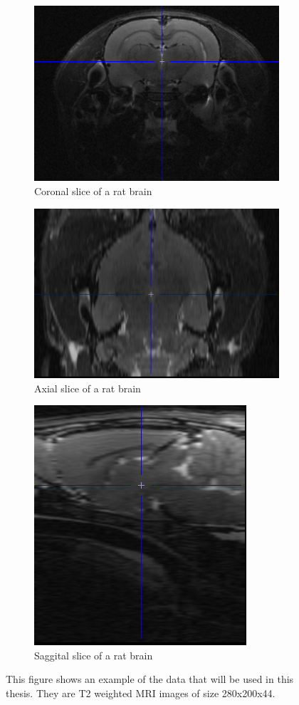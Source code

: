 \begin{figure}
\centering
\begin{subfigure}{.5\textwidth}
  \centering
  \includegraphics[width=.6\linewidth]{coronal_brain_view.png}
  \caption{Coronal slice of a rat brain}
  \label{fig:coronal}
\end{subfigure}%
\begin{subfigure}{.5\textwidth}
  \centering
  \includegraphics[width=.6\linewidth]{axial_brain_view.png}
  \caption{Axial slice of a rat brain}
  \label{fig:axial}
\end{subfigure}
\begin{subfigure}{.3\textwidth}
  \centering
  \includegraphics[width=.6\linewidth]{sagittal_brain_view.png}
  \caption{Saggital slice of a rat brain}
  \label{fig:saggital}
\end{subfigure}

\caption{This figure shows an example of the data that will be used in this thesis. They are T2 weighted MRI images of size 280x200x44. }
\label{fig:MRI image}
\end{figure}

